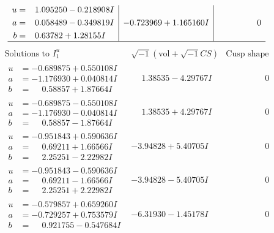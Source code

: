 \documentclass[1p]{elsarticle_modified}
\theoremstyle{definition}
\newcommand{\I}{\sqrt{-1}}
\begin{document}
$$\begin{array}{c|c|c}
\begin{aligned}
u &= \phantom{-}1.095250 - 0.218908 I \\
a &= \phantom{-}0.058489 - 0.349819 I \\
b &= \phantom{-}0.63782 + 1.28155 I\end{aligned}
 & -0.723969 + 1.165160 I & \phantom{-0.000000 } 0\\
 \hline 
 \end{array}$$\newpage$$\begin{array}{c|c|c}  
\text{Solutions to }I^u_{1}& \I (\text{vol} + \sqrt{-1}CS) & \text{Cusp shape}\\
 \hline 
\begin{aligned}
u &= -0.689875 + 0.550108 I \\
a &= -1.176930 + 0.040814 I \\
b &= \phantom{-}0.58857 + 1.87664 I\end{aligned}
 & \phantom{-}1.38535 - 4.29767 I & \phantom{-0.000000 } 0 \\ \hline\begin{aligned}
u &= -0.689875 - 0.550108 I \\
a &= -1.176930 - 0.040814 I \\
b &= \phantom{-}0.58857 - 1.87664 I\end{aligned}
 & \phantom{-}1.38535 + 4.29767 I & \phantom{-0.000000 } 0 \\ \hline\begin{aligned}
u &= -0.951843 + 0.590636 I \\
a &= \phantom{-}0.69211 + 1.66566 I \\
b &= \phantom{-}2.25251 - 2.22982 I\end{aligned}
 & -3.94828 + 5.40705 I & \phantom{-0.000000 } 0 \\ \hline\begin{aligned}
u &= -0.951843 - 0.590636 I \\
a &= \phantom{-}0.69211 - 1.66566 I \\
b &= \phantom{-}2.25251 + 2.22982 I\end{aligned}
 & -3.94828 - 5.40705 I & \phantom{-0.000000 } 0 \\ \hline\begin{aligned}
u &= -0.579857 + 0.659260 I \\
a &= -0.729257 + 0.753579 I \\
b &= \phantom{-}0.921755 - 0.547684 I\end{aligned}
 & -6.31930 - 1.45178 I & \phantom{-0.000000 } 0 \\ \hline\begin{aligned}

\end{aligned}
\end{array}$$
\end{document}
